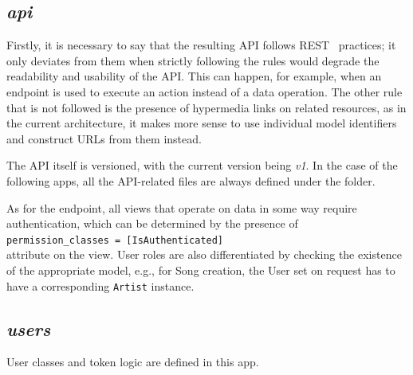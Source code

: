 \subsection{\textit{api}}
Firstly, it is necessary to say that the resulting API follows REST~\cite{restdef} practices; it only deviates from them
when strictly following the rules would degrade the readability and usability of the API.
This can happen, for example, when an endpoint is used to execute an action instead of a data operation.
The other rule that is not followed is the presence of hypermedia links on related resources,
as in the current architecture, it makes more sense to use
individual model identifiers and construct URLs from them instead.

The API itself is versioned, with the current version being \textit{v1}.
In the case of the following apps, all the API-related files are always defined under the  folder.

As for the endpoint, all views that operate on data in some way require authentication, which can be determined
by the presence of
\\\texttt{permission_classes = [IsAuthenticated]}\\
attribute on the view. User roles
are also differentiated by checking the existence of the appropriate model, e.g., for Song creation, the User set
on request has to have a corresponding \texttt{Artist} instance.

\subsection{\textit{users}}
User classes and token logic are defined in this app.


